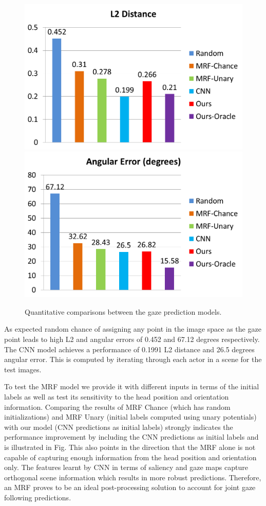 \documentclass[10pt,twocolumn,letterpaper]{article}
\begin{document}
\begin{figure}[H]
  \begin{center}
    \includegraphics[width=0.80\linewidth]{images/graph1.png} \\
    \includegraphics[width=0.80\linewidth]{images/graph2.png}
  \end{center}
  \vspace{-0.3cm}
   \caption{Quantitative comparisons between the gaze prediction models.}
  \vspace{-0.5cm}
\end{figure}

\vspace{3ex}
As expected random chance of assigning any point in the image space as the gaze point leads to high L2 and angular errors of 0.452 and 67.12 degrees respectively.  The CNN model achieves a performance of 0.1991 L2 distance and 26.5 degrees angular error. This is computed by iterating through each actor in a scene for the test images.

To test the MRF model we provide it with different inputs in terms of the initial labels as well as test its sensitivity to the head position and orientation information.  Comparing the results of MRF Chance (which has random initializations) and MRF Unary (initial labels computed using unary potentials)  with our model (CNN predictions as initial labels) strongly indicates the performance improvement by including the CNN predictions as initial labels and is illustrated in Fig. This also points in the direction that the MRF alone is not capable of capturing enough information from the head position and orientation only. The features learnt by CNN in terms of saliency and gaze maps capture orthogonal scene information which results in more robust predictions. Therefore, an MRF proves to be an ideal post-processing solution to account for joint gaze following predictions.
\end{document}
